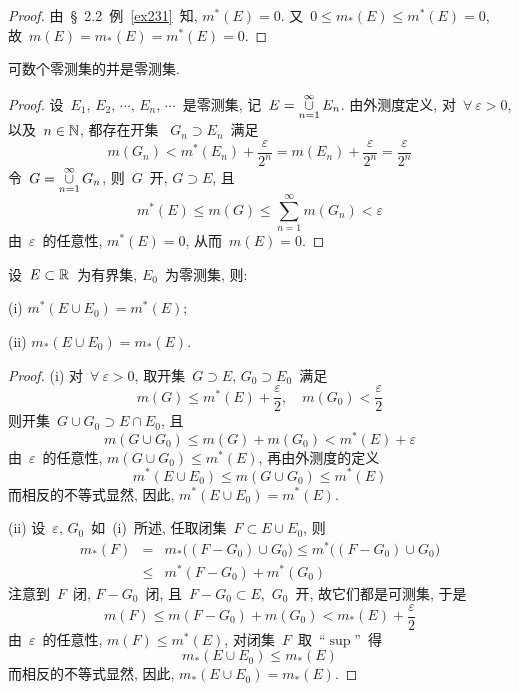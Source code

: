 \medskip

\begin{proof}
由~\S~2.2~例~\ref{ex231}~知, $m^*(E) = 0$. 又~$0 \leqslant m_*(E) \leqslant m^*(E) =0$,
故~$m(E) = m_*(E) = m^*(E) =0$.
\end{proof}

\begin{theorem} \label{thm0}
可数个零测集的并是零测集.
\end{theorem}

\begin{proof}
设~$E_1,\,E_2,\,\cdots,\, E_n, \, \cdots$~是零测集, 记~$E = \mathop{\cup}\limits_{n=1}^\infty
E_n$. 由外测度定义, 对~$\forall~\varepsilon > 0$, 以及~$n \in \mathbb{N}$, 都存在开集~
$G_n \supset E_n$~满足
\[
m(G_n) < m^*(E_n) + \frac{\varepsilon}{2^n} = m(E_n) + \frac{\varepsilon}{2^n}
= \frac{\varepsilon}{2^n}
\]
令~$G = \mathop{\cup}\limits_{n=1}^\infty G_n$, 则~$G$~开, $G \supset E$, 且
\[
m^*(E) \leqslant m(G) \leqslant \sum_{n=1}^\infty m(G_n) < \varepsilon
\]
由~$\varepsilon$~的任意性, $m^*(E) = 0$, 从而~$m(E) = 0$.
\end{proof}

\begin{theorem} \label{thm242}
设~$E \subset \mathbb{R}$~为有界集, $E_0$~为零测集, 则:

(i) $m^*(E \cup E_0) = m^*(E)$;

(ii) $m_*(E \cup E_0) = m_*(E)$.
\end{theorem}

\begin{proof}
(i) 对~$\forall~\varepsilon > 0$, 取开集~$G \supset E,\,G_0 \supset E_0$~满足
\[
m(G) \leqslant m^*(E) + \frac{\varepsilon}{2}, \quad m(G_0) < \frac{\varepsilon}{2}
\]
则开集~$G \cup G_0 \supset E \cap E_0$, 且
\[
m(G \cup G_0) \leqslant m(G) + m(G_0) < m^*(E) + \varepsilon
\]
由~$\varepsilon$~的任意性, $m(G \cup G_0) \leqslant m^*(E)$, 再由外测度的定义
\[
m^*(E \cup E_0) \leqslant m(G \cup G_0) \leqslant m^*(E)
\]
而相反的不等式显然, 因此, $m^*(E \cup E_0) = m^*(E)$.

(ii) 设~$\varepsilon,\,G_0$~如~(i)~所述, 任取闭集~$F \subset E \cup E_0$, 则
\begin{eqnarray*}
m_*(F) &=& m_*\big((F - G_0) \cup G_0 \big) \leqslant m^*\big((F - G_0) \cup G_0 \big) \\
&\leqslant& m^*(F - G_0) + m^*(G_0)
\end{eqnarray*}
注意到~$F$~闭, $F - G_0$~闭, 且~$F - G_0 \subset E$,\, $G_0$~开, 故它们都是可测集, 于是
\[
m(F) \leqslant m(F-G_0) + m(G_0) < m_*(E) + \frac{\varepsilon}{2}
\]
由~$\varepsilon$~的任意性, $m(F) \leqslant m^*(E)$, 对闭集~$F$~取~``$\sup$''~得
\[
m_*(E \cup E_0) \leqslant m_*(E)
\]
而相反的不等式显然, 因此, $m_*(E \cup E_0) = m_*(E)$.
\end{proof}

